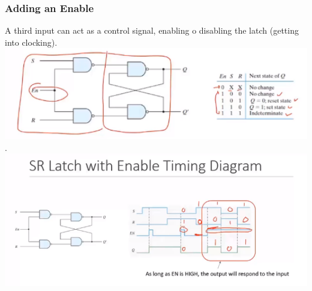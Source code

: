 \documentclass[a4paper,12pt]{article}
\begin{document}
            \subsubsection{Adding an  Enable}
                A third input can act as a control signal, enabling o disabling the latch (getting into clocking).\\
                \includegraphics[width=14cm]{enabledLatch.png}. \\
                \includegraphics[width=16cm]{SRwithTiming.png}
\end{document}
